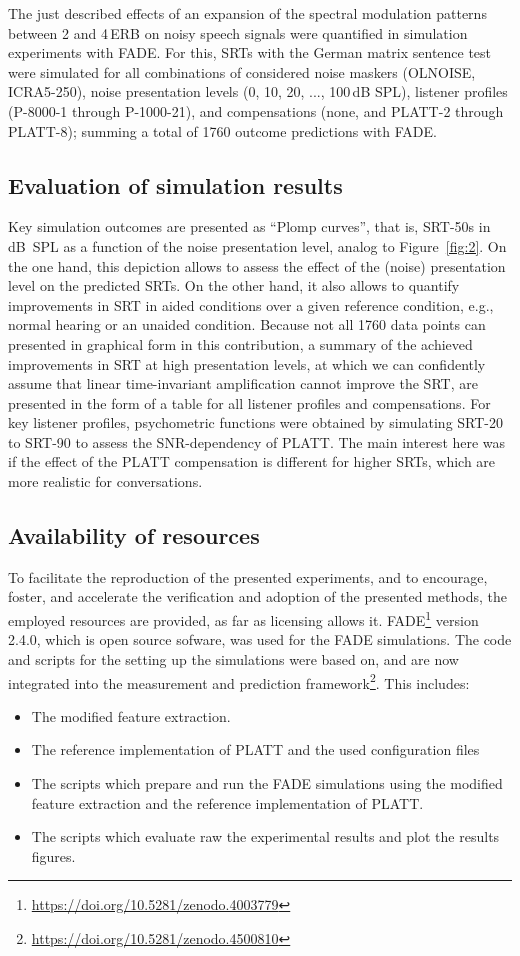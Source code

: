 \documentclass[10pt,a4paper,twocolumn]{article}
\begin{document}
The just described effects of an expansion of the spectral modulation patterns between 2 and 4\,ERB on noisy speech signals were quantified in simulation experiments with FADE.
%
For this, SRTs with the German matrix sentence test were simulated for all combinations of considered noise maskers (OLNOISE, ICRA5-250), noise presentation levels (0, 10, 20, ..., 100\,dB SPL), listener profiles (P-8000-1 through P-1000-21), and compensations (none, and PLATT-2 through PLATT-8); summing a total of 1760 outcome predictions with FADE.

\subsection*{Evaluation of simulation results}
%
Key simulation outcomes are presented as \enquote{Plomp curves}, that is, SRT-50s in dB~SPL as a function of the noise presentation level, analog to Figure~\ref{fig:2}.
%
On the one hand, this depiction allows to assess the effect of the (noise) presentation level on the predicted SRTs.
%
On the other hand, it also allows to quantify improvements in SRT in aided conditions over a given reference condition, e.g., normal hearing or an unaided condition.
%
Because not all 1760 data points can presented in graphical form in this contribution, a summary of the achieved improvements in SRT at high presentation levels, at which we can confidently assume that linear time-invariant amplification cannot improve the SRT, are presented in the form of a table for all listener profiles and compensations.
%
For key listener profiles, psychometric functions were obtained by simulating SRT-20 to SRT-90 to assess the SNR-dependency of PLATT.
%
The main interest here was if the effect of the PLATT compensation is different for higher SRTs, which are more realistic for conversations.

\subsection*{Availability of resources}
\label{sec:ressources}
%
To facilitate the reproduction of the presented experiments, and to encourage, foster, and accelerate the verification and adoption of the presented methods, the employed resources are provided, as far as licensing allows it.
%
FADE\footnote{\url{https://doi.org/10.5281/zenodo.4003779}} version 2.4.0, which is open source sofware, was used for the FADE simulations.
%
The code and scripts for the setting up the simulations were based on, and are now integrated into the measurement and prediction framework\footnote{\url{https://doi.org/10.5281/zenodo.4500810}}.
%
This includes:
\begin{itemize}
	\item The modified feature extraction.
	\item The reference implementation of PLATT and the used configuration files
	\item The scripts which prepare and run the FADE simulations using the modified feature extraction and the reference implementation of PLATT.
	\item The scripts which evaluate raw the experimental results and plot the results figures.
\end{itemize}
\end{document}
